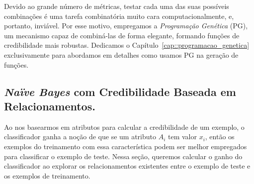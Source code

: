 Devido ao grande número de métricas, testar cada uma das suas possíveis combinações é uma tarefa combinatória muito cara computacionalmente, e, portanto, inviável. Por esse motivo, empregamos a \textit{Programação Genética} (\textsc{PG}), um mecanismo capaz de combiná-las de forma elegante, formando funções de credibilidade mais robustas. Dedicamos o Capítulo~\ref{cap::programacao_genetica} exclusivamente para abordamos em detalhes como usamos \textsc{PG} na geração de funções.










\subsection{\textit{Naïve Bayes} com Credibilidade Baseada em Relacionamentos.}
\label{subsubsec::nbcredgrafos}

Ao nos basearmos em atributos para calcular a credibilidade de um exemplo, o classificador ganha a noção de que se um atributo $A_i$ tem valor $x_i$, então os exemplos do treinamento com essa característica podem ser melhor empregados para classificar o exemplo de teste.
Nessa seção, queremos calcular o ganho do classificador ao explorar os relacionamentos existentes entre o exemplo de teste e os exemplos de treinamento. 

